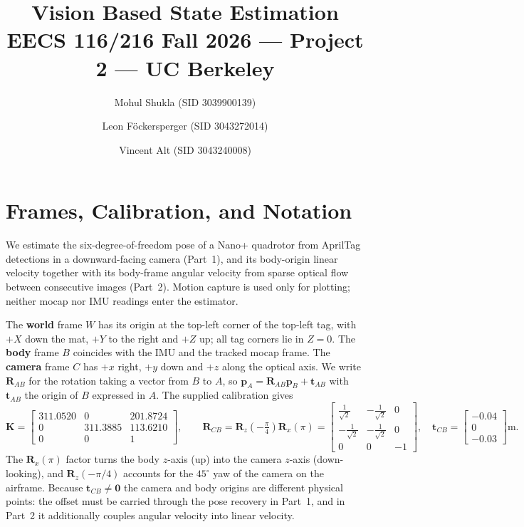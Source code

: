 \documentclass[10pt]{article}
\title{\vspace{-2.4em}\textbf{Vision Based State Estimation}\\[0.15em]
\large EECS 116/216 Fall 2026 --- Project 2 --- UC Berkeley}
\author{Mohul Shukla (SID 3039900139) \and Leon F\"ockersperger (SID 3043272014)
\and Vincent Alt (SID 3043240008)}
\date{}
\newcommand{\R}{\mathbf{R}}
\newcommand{\vt}[1]{\mathbf{#1}}
\newcommand{\Rcb}{\R_{CB}}
\begin{document}
\maketitle
\vspace{-2.8em}

\section{Frames, Calibration, and Notation}

We estimate the six-degree-of-freedom pose of a Nano+ quadrotor from AprilTag detections in a
downward-facing camera (Part~1), and its body-origin linear velocity together with its body-frame
angular velocity from sparse optical flow between consecutive images (Part~2). Motion capture is
used only for plotting; neither mocap nor IMU readings enter the estimator.

The \textbf{world} frame $W$ has its origin at the top-left corner of the top-left tag, with $+X$
down the mat, $+Y$ to the right and $+Z$ up; all tag corners lie in $Z=0$. The \textbf{body} frame
$B$ coincides with the IMU and the tracked mocap frame. The \textbf{camera} frame $C$ has $+x$
right, $+y$ down and $+z$ along the optical axis. We write $\R_{AB}$ for the rotation taking a
vector from $B$ to $A$, so $\vt{p}_A = \R_{AB}\vt{p}_B + \vt{t}_{AB}$ with $\vt{t}_{AB}$ the origin
of $B$ expressed in $A$. The supplied calibration gives
\begin{equation}
\mathbf{K} = \begin{bmatrix} 311.0520 & 0 & 201.8724 \\ 0 & 311.3885 & 113.6210 \\ 0 & 0 & 1\end{bmatrix},
\qquad
\Rcb = \R_z(-\tfrac{\pi}{4})\R_x(\pi) = \begin{bmatrix}
\tfrac{1}{\sqrt2} & -\tfrac{1}{\sqrt2} & 0\\[1pt]
-\tfrac{1}{\sqrt2} & -\tfrac{1}{\sqrt2} & 0\\[1pt]
0 & 0 & -1 \end{bmatrix},
\quad
\vt{t}_{CB} = \begin{bmatrix}-0.04\\0\\-0.03\end{bmatrix}\!\text{m}.
\label{eq:bodycam}
\end{equation}
The $\R_x(\pi)$ factor turns the body $z$-axis (up) into the camera $z$-axis (down-looking), and
$\R_z(-\pi/4)$ accounts for the $45^\circ$ yaw of the camera on the airframe. Because
$\vt{t}_{CB}\neq\vt{0}$ the camera and body origins are different physical points: the offset must
be carried through the pose recovery in Part~1, and in Part~2 it additionally couples angular
velocity into linear velocity.
\end{document}
